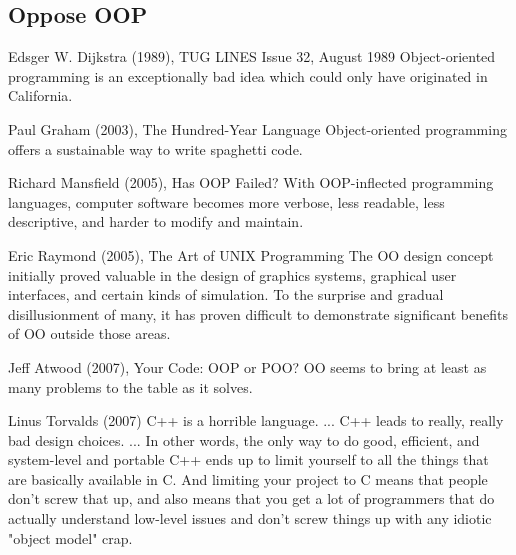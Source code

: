 \documentclass[12pt]{book}
\begin{document}
\subsection{Oppose OOP}

\begin{kodequote}{Edsger W. Dijkstra (1989), TUG LINES Issue 32, August 1989}
	Object-oriented programming is an exceptionally bad idea which could only have originated in California.
\end{kodequote}


\begin{kodequote}{Paul Graham (2003), The Hundred-Year Language}
	Object-oriented programming offers a sustainable way to write spaghetti code.
\end{kodequote}

\begin{kodequote}{Richard Mansfield (2005), Has OOP Failed?}
	With OOP-inflected programming languages, computer software becomes more verbose, less readable, less descriptive, and harder to modify and maintain.
\end{kodequote}

\begin{kodequote}{Eric Raymond (2005), The Art of UNIX Programming}
	The OO design concept initially proved valuable in the design of graphics systems, graphical user interfaces, and certain kinds of simulation. To the surprise and gradual disillusionment of many, it has proven difficult to demonstrate significant benefits of OO outside those areas.
\end{kodequote}

\begin{kodequote}{Jeff Atwood (2007), Your Code: OOP or POO?}
	OO seems to bring at least as many problems to the table as it solves.
\end{kodequote}


\begin{kodequote}{Linus Torvalds (2007)}
	C++ is a horrible language. ... C++ leads to really, really bad design choices. ... In other words, the only way to do good, efficient, and system-level and portable C++ ends up to limit yourself to all the things that are basically available in C. And limiting your project to C means that people don't screw that up, and also means that you get a lot of programmers that do actually understand low-level issues and don't screw things up with any idiotic "object model" crap.
\end{kodequote}
\end{document}
